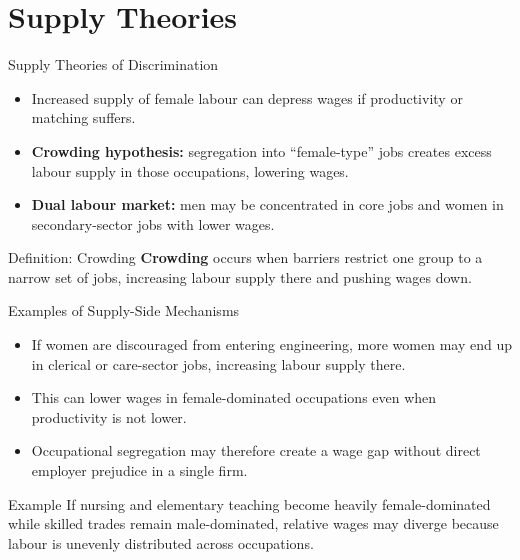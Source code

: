 \documentclass[aspectratio=169]{beamer}
\begin{document}
\section{Supply Theories}

\begin{frame}{Supply Theories of Discrimination}
\transfade
\begin{itemize}[<+->]
  \item Increased supply of female labour can depress wages if productivity or matching suffers.
  \item \textbf{Crowding hypothesis:} segregation into ``female-type'' jobs creates excess labour supply in those occupations, lowering wages.
  \item \textbf{Dual labour market:} men may be concentrated in core jobs and women in secondary-sector jobs with lower wages.
\end{itemize}

\begin{block}{Definition: Crowding}
\textbf{Crowding} occurs when barriers restrict one group to a narrow set of jobs, increasing labour supply there and pushing wages down.
\end{block}
\end{frame}

\begin{frame}{Examples of Supply-Side Mechanisms}
\transfade
\begin{itemize}[<+->]
  \item If women are discouraged from entering engineering, more women may end up in clerical or care-sector jobs, increasing labour supply there.
  \item This can lower wages in female-dominated occupations even when productivity is not lower.
  \item Occupational segregation may therefore create a wage gap without direct employer prejudice in a single firm.
\end{itemize}

\begin{exampleblock}{Example}
If nursing and elementary teaching become heavily female-dominated while skilled trades remain male-dominated, relative wages may diverge because labour is unevenly distributed across occupations.
\end{exampleblock}
\end{frame}
\end{document}
